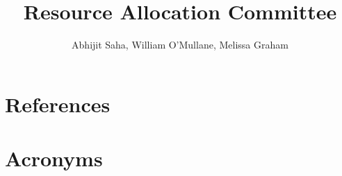 \documentclass[OPS,lsstdraft,authoryear,toc]{lsstdoc}
\title{Resource Allocation Committee}
\author{%
Abhijit Saha, William O'Mullane, Melissa Graham
}
\date{\vcsDate}
\begin{document}

\maketitle



\appendix
\section{References} \label{sec:bib}
\renewcommand{\refname}{} %


\section{Acronyms} \label{sec:acronyms}

\end{document}
